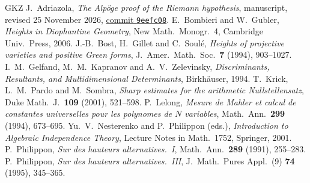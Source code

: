 \documentclass[reqno]{amsart}
\theoremstyle{definition}
\theoremstyle{plain}
\begin{document}
\begin{thebibliography}{GKZ}
 J.~Adriazola, \emph{The Alp\"oge proof of the Riemann hypothesis}, manuscript, revised 25 November 2026, \href{https://github.com/jimjamzola/RH-Alpoge-Reconstruction/tree/9eefc08b0819728d4dd2ef0568b49a61251af111}{commit \texttt{9eefc08}}.
 E.~Bombieri and W.~Gubler, \emph{Heights in Diophantine Geometry}, New Math.\ Monogr.\ 4, Cambridge Univ.\ Press, 2006.
 J.-B.~Bost, H.~Gillet and C.~Soul\'e, \emph{Heights of projective varieties and positive Green forms}, J.\ Amer.\ Math.\ Soc.\ \textbf{7} (1994), 903--1027.
 I.~M.~Gelfand, M.~M.~Kapranov and A.~V.~Zelevinsky, \emph{Discriminants, Resultants, and Multidimensional Determinants}, Birkh\"auser, 1994.
 T.~Krick, L.~M.~Pardo and M.~Sombra, \emph{Sharp estimates for the arithmetic Nullstellensatz}, Duke Math.\ J.\ \textbf{109} (2001), 521--598.
 P.~Lelong, \emph{Mesure de Mahler et calcul de constantes universelles pour les polynomes de \(N\) variables}, Math.\ Ann.\ \textbf{299} (1994), 673--695.
 Yu.~V.~Nesterenko and P.~Philippon (eds.), \emph{Introduction to Algebraic Independence Theory}, Lecture Notes in Math.\ 1752, Springer, 2001.
 P.~Philippon, \emph{Sur des hauteurs alternatives.\ I}, Math.\ Ann.\ \textbf{289} (1991), 255--283.
 P.~Philippon, \emph{Sur des hauteurs alternatives.\ III}, J.\ Math.\ Pures Appl.\ (9) \textbf{74} (1995), 345--365.
\end{thebibliography}
\end{document}
